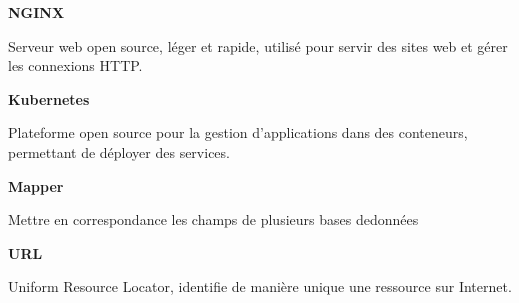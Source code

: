 \vspace{1cm}

\begin{minipage}{\textwidth}
    \begin{minipage}{0.1\textwidth}
        \textbf{NGINX}
    \end{minipage}\hfill
    \begin{minipage}{0.8\textwidth}
        Serveur web open source, léger et rapide, utilisé pour servir des sites web et gérer les connexions HTTP.
    \end{minipage}
\end{minipage}

\vspace{1cm}

\begin{minipage}{\textwidth}
    \begin{minipage}{0.1\textwidth}
        \textbf{Kubernetes}
    \end{minipage}\hfill
    \begin{minipage}{0.8\textwidth}
        Plateforme open source pour la gestion d'applications dans des conteneurs, permettant de déployer des services.
    \end{minipage}
\end{minipage}

\vspace{1cm}

\begin{minipage}{\textwidth}
    \begin{minipage}{0.1\textwidth}
        \textbf{Mapper}
    \end{minipage}\hfill
    \begin{minipage}{0.8\textwidth}
        Mettre en correspondance les champs de plusieurs bases dedonnées
    \end{minipage}
\end{minipage}

\vspace{1cm}

\begin{minipage}{\textwidth}
    \begin{minipage}{0.1\textwidth}
        \textbf{URL}
    \end{minipage}\hfill
    \begin{minipage}{0.8\textwidth}
        Uniform Resource Locator, identifie de manière unique une ressource sur Internet.
    \end{minipage}
\end{minipage}

